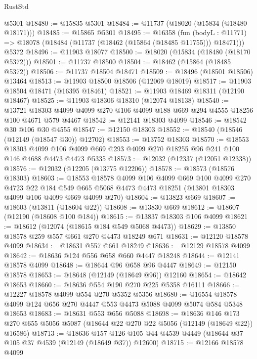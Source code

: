 \begin{lexlean}{RustStd}
\begin{coremodule}
    @5301
@18480 := @15835 @5301
@18484 := @11737 (@18020 (@15834 (@18480 @18171)))
@18485 := @15865 @5301
@18495 := @16358
    (fun (bodyL : @11771) => @18078 (@18484 (@11737 (@18462 (@15864 (@18485 @11755))) @18471)))
    @5372
@18496 := @11903 @18077
@18500 := @18020 (@15834 (@18480 (@18170 @5372)))
@18501 := @11737 @18500
@18504 := @18462 (@15864 (@18485 @5372))
@18506 := @11737 @18504 @18471
@18509 := @18496 (@18501 @18506) @13464
@18513 := @11903 @18500 @18506 (@12069 @18019)
@18517 := @11903 @18504 @18471 (@16395 @18461)
@18521 := @11903 @18469 @18311 (@12190 @18467)
@18525 := @11903 @18306 @18310 (@12074 @18138)
@18540 := @13721
    @18303
    @4099
    @4099
    @270
    @106
    @4099
    @188
    @669
    @294
    @4555
    @18256
    @100
    @4671
    @579
    @4467
@18542 := @12141 @18303 @4099
@18546 := @18542 @30 @106 @30 @4555
@18547 := @12150 @18303
@18552 := @18540 (@18546 (@12149 (@18547 @30)) @12702)
@18553 := @13752 @18303
@18570 := @18553
    @18303
    @4099
    @106
    @4099
    @669
    @293
    @4099
    @270
    @18255
    @96
    @241
    @100
    @146
    @4688
    @4473
    @4473
    @5335
@18573 := @12032 (@12337 (@12051 @12338))
@18576 := @12032 (@12205 (@13775 @12206))
@18578 := @18573 (@18576 @18303)
@18603 := @18553
    @18578
    @4099
    @106
    @4099
    @669
    @100
    @4099
    @270
    @4723
    @22
    @184
    @549
    @665
    @5068
    @4473
    @4473
    @18251
    (@13801 @18303 @4099 @106 @4099 @669 @4099 @270)
@18604 := @13823 @669
@18607 := @18603 (@13811 (@18604 @22))
@18608 := @13830 @669
@18612 := @18607 (@12190 (@18608 @100 @184))
@18615 := @13837 @18303 @106 @4099
@18621 := @18612 (@12074 (@18615 @184 @549 @5068 @4473))
@18629 := @13850 @18578 @259 @557 @661 @270 @4473 @18249 @671
@18631 := @12120 @18578 @4099
@18634 := @18631 @557 @661 @18249
@18636 := @12129 @18578 @4099
@18642 := @18636 @124 @556 @658 @660 @4447 @18248
@18644 := @12141 @18578 @4099
@18648 := @18644 @96 @658 @96 @4447
@18649 := @12150 @18578
@18653 := @18648 (@12149 (@18649 @96)) @12160
@18654 := @18642 @18653
@18660 := @18636 @554 @190 @270 @225 @5358 @16111
@18666 := @12227 @18578 @4099 @554 @270 @5352 @5356
@18680 := @16554 @18578 @4099 @124 @656 @270 @4447 @553 @4473 @5088 @4099 @5074 @584 @5348 @18653
@18683 := @18631 @553 @656 @5088
@18698 := @18636
    @146
    @173
    @270
    @655
    @5056
    @5087
    (@18644 @22 @270 @22 @5056 (@12149 (@18649 @22)) @16586)
@18713 := @18636
    @157
    @126
    @105
    @44
    @4539
    @4449
    (@18644 @37 @105 @37 @4539 (@12149 (@18649 @37)) @12600)
@18715 := @12166 @18578 @4099

\end{coremodule}
\end{lexlean}
